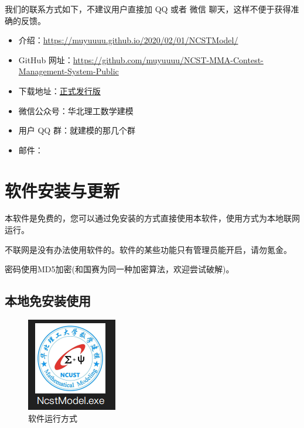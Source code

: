 \documentclass[cn,11pt,chinese, hazy]{elegantbook}
\begin{document}
我们的联系方式如下，不建议用户直接加 QQ 或者 微信 聊天，这样不便于获得准确的反馈。
\begin{itemize}
  \item 介绍：\href{https://muyuuuu.github.io/2020/02/01/NCSTModel/}{https://muyuuuu.github.io/2020/02/01/NCSTModel/}
  \item GitHub 网址：\href{https://github.com/muyuuuu/NCST-MMA-Contest-Management-System-Public}{https://github.com/muyuuuu/NCST-MMA-Contest-Management-System-Public}
  \item 下载地址：\href{https://github.com/muyuuuu/NCST-MMA-Contest-Management-System-Public/releases}{正式发行版}
  \item 微信公众号：华北理工数学建模
  \item 用户 QQ 群：就建模的那几个群
  \item 邮件：
\end{itemize}

\section{软件安装与更新}

本软件是免费的，您可以通过免安装的方式直接使用本软件，使用方式为本地联网运行。

\begin{remark}
不联网是没有办法使用软件的。软件的某些功能只有管理员能开启，请勿氪金。
\end{remark}

\begin{remark}
密码使用MD5加密(和国赛为同一种加密算法，欢迎尝试破解)。
\end{remark}

\subsection{本地免安装使用}

\begin{figure}[h]
    \centering
    \includegraphics{figure/1.png}
    \caption{软件运行方式}
    \label{fig:exe}
\end{figure}
\end{document}
